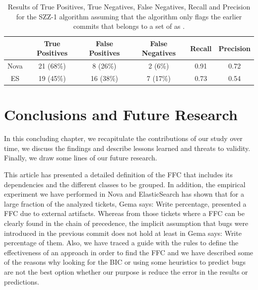 \documentclass[a4paper, 12pt]{book}
\begin{document}
\begin{table}[!t]
	\renewcommand{\arraystretch}{1.3}
	\caption{Results of True Positives, True Negatives, False Negatives, Recall and Precision for the SZZ-1 algorithm assuming that the algorithm only flags the earlier commits that belongs to a set of  as \BIC.}
	\label{realSZZ2}
	\centering
	\begin{tabular}{|c|c|c|c|c|c|}
		\hline
 	 	&  True Positives & False Positives & False Negatives & Recall & Precision \\
		\hline
		\hline
		Nova & 21 (68\%) & 8 (26\%) & 2 (6\%) & 0.91 & 0.72\\
		\hline
		ES &  19 (45\%) & 16 (38\%) & 7 (17\%)& 0.73 & 0.54 \\
		\hline
	\end{tabular}
\end{table}


\vspace{0.2cm}
\vspace{0.1cm}



\cleardoublepage
\chapter{Conclusions and Future Research}
\label{chap:conclusions}
In this concluding chapter, we recapitulate the contributions of our study over time, we discuss the findings and describe lessons learned and threats to validity. Finally, we draw some lines of our future research.


This article has presented a detailed definition of the FFC that includes its dependencies and the different classes to be grouped. In addition, the empirical experiment we have performed in Nova and ElasticSearch has shown that for a large fraction of the analyzed tickets, Gema says: Write percentage, presented a FFC due to external artifacts. Whereas from those tickets where a FFC can be clearly found in the chain of precedence, the implicit assumption that bugs were introduced in the previous commit does not hold at least in Gema says: Write percentage of them.
Also, we have traced a guide with the rules to define the effectiveness of an approach in order to find the FFC and we have described some of the reasons why looking for the BIC or using some heuristics to predict bugs are not the best option whether our purpose is reduce the error in the results or predictions.
\end{document}
